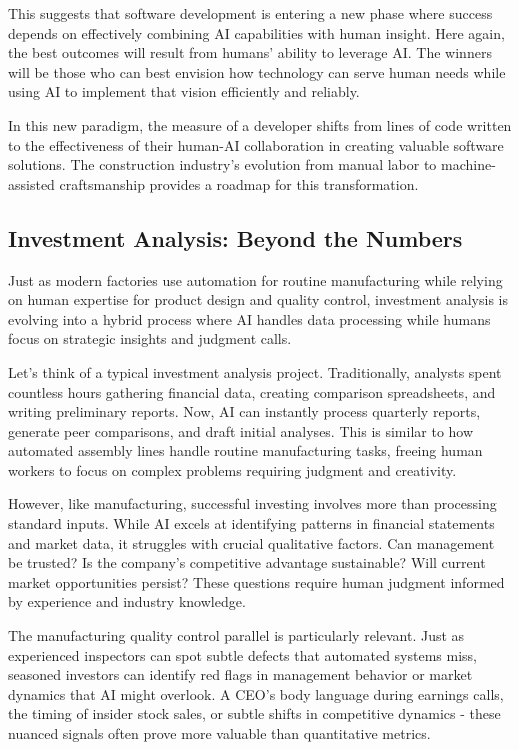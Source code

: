 \documentclass[
  Letterpaper,
]{scrbook}
\begin{document}
This suggests that software development is entering a new phase where
success depends on effectively combining AI capabilities with human
insight. Here again, the best outcomes will result from humans' ability
to leverage AI. The winners will be those who can best envision how
technology can serve human needs while using AI to implement that vision
efficiently and reliably.

In this new paradigm, the measure of a developer shifts from lines of
code written to the effectiveness of their human-AI collaboration in
creating valuable software solutions. The construction industry's
evolution from manual labor to machine-assisted craftsmanship provides a
roadmap for this transformation.

\subsection{Investment Analysis: Beyond the
Numbers}\label{investment-analysis-beyond-the-numbers}

Just as modern factories use automation for routine manufacturing while
relying on human expertise for product design and quality control,
investment analysis is evolving into a hybrid process where AI handles
data processing while humans focus on strategic insights and judgment
calls.

Let's think of a typical investment analysis project. Traditionally,
analysts spent countless hours gathering financial data, creating
comparison spreadsheets, and writing preliminary reports. Now, AI can
instantly process quarterly reports, generate peer comparisons, and
draft initial analyses. This is similar to how automated assembly lines
handle routine manufacturing tasks, freeing human workers to focus on
complex problems requiring judgment and creativity.

However, like manufacturing, successful investing involves more than
processing standard inputs. While AI excels at identifying patterns in
financial statements and market data, it struggles with crucial
qualitative factors. Can management be trusted? Is the company's
competitive advantage sustainable? Will current market opportunities
persist? These questions require human judgment informed by experience
and industry knowledge.

The manufacturing quality control parallel is particularly relevant.
Just as experienced inspectors can spot subtle defects that automated
systems miss, seasoned investors can identify red flags in management
behavior or market dynamics that AI might overlook. A CEO's body
language during earnings calls, the timing of insider stock sales, or
subtle shifts in competitive dynamics - these nuanced signals often
prove more valuable than quantitative metrics.
\end{document}
